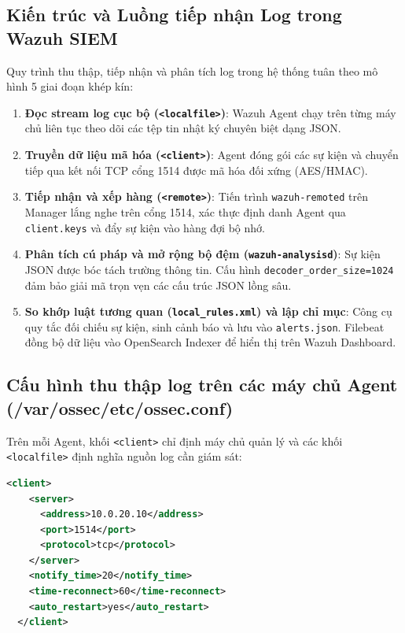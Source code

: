 \subsection{Kiến trúc và Luồng tiếp nhận Log trong Wazuh SIEM}
Quy trình thu thập, tiếp nhận và phân tích log trong hệ thống tuân theo mô hình 5 giai đoạn khép kín:
\begin{enumerate}
    \item \textbf{Đọc stream log cục bộ (\texttt{<localfile>})}: Wazuh Agent chạy trên từng máy chủ liên tục theo dõi các tệp tin nhật ký chuyên biệt dạng JSON.
    \item \textbf{Truyền dữ liệu mã hóa (\texttt{<client>})}: Agent đóng gói các sự kiện và chuyển tiếp qua kết nối TCP cổng 1514 được mã hóa đối xứng (AES/HMAC).
    \item \textbf{Tiếp nhận và xếp hàng (\texttt{<remote>})}: Tiến trình \texttt{wazuh-remoted} trên Manager lắng nghe trên cổng 1514, xác thực định danh Agent qua \texttt{client.keys} và đẩy sự kiện vào hàng đợi bộ nhớ.
    \item \textbf{Phân tích cú pháp và mở rộng bộ đệm (\texttt{wazuh-analysisd})}: Sự kiện JSON được bóc tách trường thông tin. Cấu hình \texttt{decoder\_order\_size=1024} đảm bảo giải mã trọn vẹn các cấu trúc JSON lồng sâu.
    \item \textbf{So khớp luật tương quan (\texttt{local\_rules.xml}) và lập chỉ mục}: Công cụ quy tắc đối chiếu sự kiện, sinh cảnh báo và lưu vào \texttt{alerts.json}. Filebeat đồng bộ dữ liệu vào OpenSearch Indexer để hiển thị trên Wazuh Dashboard.
\end{enumerate}

\subsection{Cấu hình thu thập log trên các máy chủ Agent (/var/ossec/etc/ossec.conf)}
Trên mỗi Agent, khối \texttt{<client>} chỉ định máy chủ quản lý và các khối \texttt{<localfile>} định nghĩa nguồn log cần giám sát:

\begin{lstlisting}[language=xml, caption={Cấu hình kết nối Agent tới Manager (/var/ossec/etc/ossec.conf)}]
  <client>
    <server>
      <address>10.0.20.10</address>
      <port>1514</port>
      <protocol>tcp</protocol>
    </server>
    <notify_time>20</notify_time>
    <time-reconnect>60</time-reconnect>
    <auto_restart>yes</auto_restart>
  </client>
\end{lstlisting}

